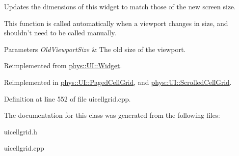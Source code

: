Updates the dimensions of this widget to match those of the new screen size. 

This function is called automatically when a viewport changes in size, and shouldn't need to be called manually. 
\begin{DoxyParams}{Parameters}
{\em OldViewportSize} & The old size of the viewport. \\
\hline
\end{DoxyParams}


Reimplemented from \hyperlink{classphys_1_1UI_1_1Widget_acbda7003549c6caac46078c034657929}{phys::UI::Widget}.



Reimplemented in \hyperlink{classphys_1_1UI_1_1PagedCellGrid_a7d6ddd7126f86d2ea6592ac3f9a91037}{phys::UI::PagedCellGrid}, and \hyperlink{classphys_1_1UI_1_1ScrolledCellGrid_aed1f61cbdab04c555e26076ec933bbf2}{phys::UI::ScrolledCellGrid}.



Definition at line 552 of file uicellgrid.cpp.



The documentation for this class was generated from the following files:\begin{DoxyCompactItemize}
\item 
uicellgrid.h\item 
uicellgrid.cpp\end{DoxyCompactItemize}
